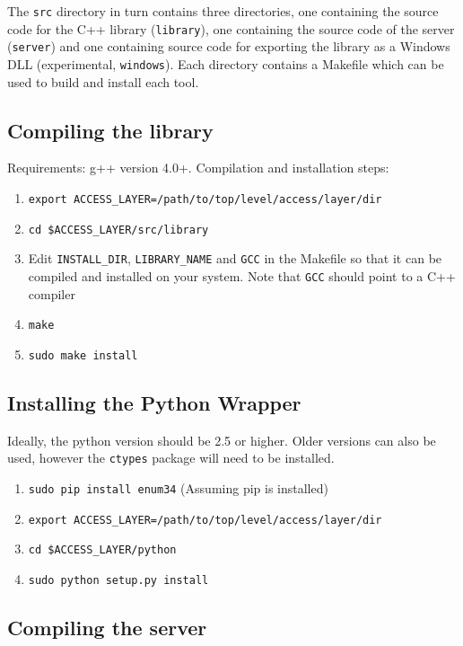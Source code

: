 \documentclass[a4paper,11pt]{article}
\begin{document}
The \texttt{src} directory in turn contains three directories, one containing 
the source code for the C++ library (\texttt{library}), one containing the 
source code of the server (\texttt{server}) and one containing source code for 
exporting the library as a Windows DLL (experimental, \texttt{windows}). Each 
directory contains a Makefile which can be used to build and install each tool. 

\subsection*{Compiling the library}

Requirements: g++ version 4.0+. Compilation and installation steps:
\begin{enumerate}
 \item \texttt{export ACCESS\_LAYER=/path/to/top/level/access/layer/dir}
 \item \texttt{cd \$ACCESS\_LAYER/src/library}
 \item Edit \texttt{INSTALL\_DIR}, \texttt{LIBRARY\_NAME} and \texttt{GCC} in 
the Makefile so that it can be compiled and installed on your system. Note that 
\texttt{GCC} should point to a C++ compiler
 \item \texttt{make}
 \item \texttt{sudo make install}
\end{enumerate}

\subsection*{Installing the Python Wrapper}

Ideally, the python version should be 2.5 or higher. Older versions can also be 
used, however the \texttt{ctypes} package will need to be installed. 

\begin{enumerate}
 \item \texttt{sudo pip install enum34} (Assuming pip is installed)
 \item \texttt{export ACCESS\_LAYER=/path/to/top/level/access/layer/dir}
 \item \texttt{cd \$ACCESS\_LAYER/python}
 \item \texttt{sudo python setup.py install}
\end{enumerate}


\subsection*{Compiling the server}
\end{document}
